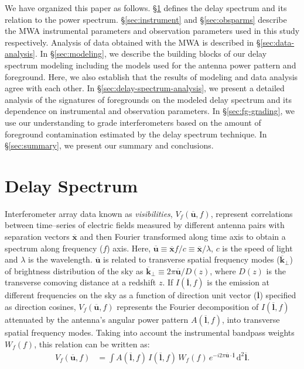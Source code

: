 \documentclass[preprint2,iop,numberedappendix]{emulateapj}
\newcommand{\dif}{\mathrm{d}}
\begin{document}
We have organized this paper as follows. \S\ref{sec:delay-spectrum} defines the delay spectrum and its relation to the power spectrum. \S\ref{sec:instrument} and \S\ref{sec:obsparms} describe the MWA instrumental parameters and observation parameters used in this study respectively. Analysis of data obtained with the MWA is described in \S\ref{sec:data-analysis}. In \S\ref{sec:modeling}, we describe the building blocks of our delay spectrum modeling including the models used for the antenna power pattern and foreground. Here, we also establish that the results of modeling and data analysis agree with each other. In \S\ref{sec:delay-spectrum-analysis}, we present a detailed analysis of the signatures of foregrounds on the modeled delay spectrum and its dependence on instrumental and observation parameters. In \S\ref{sec:fg-grading}, we use our understanding to grade interferometers based on the amount of foreground contamination estimated by the delay spectrum technique. In \S\ref{sec:summary}, we present our summary and conclusions.

\section{Delay Spectrum}\label{sec:delay-spectrum}

Interferometer array data known as {\it visibilities}, $V_f(\overline{\mathbf{u}},f)$, represent correlations between time--series of electric fields measured by different antenna pairs with separation vectors $\overline{\mathbf{x}}$ and then Fourier transformed along time axis to obtain a spectrum along frequency ($f$) axis. Here, $\overline{\mathbf{u}}\equiv \overline{\mathbf{x}}f/c \equiv \overline{\mathbf{x}}/\lambda$, $c$ is the speed of light and $\lambda$ is the wavelength. $\overline{\mathbf{u}}$ is related to transverse spatial frequency modes ($\overline{\mathbf{k}}_\perp$) of brightness distribution of the sky as $\overline{\mathbf{k}}_\perp \equiv 2\pi\overline{\mathbf{u}}/D(z)$, where $D(z)$ is the transverse comoving distance at a redshift $z$. If $I(\overline{\mathbf{l}},f)$ is the emission at different frequencies on the sky as a function of direction unit vector ($\overline{\mathbf{l}}$) specified as direction cosines, $V_f(\overline{\mathbf{u}},f)$ represents the Fourier decomposition of $I(\overline{\mathbf{l}},f)$ attenuated by the antenna's angular power pattern $A(\overline{\mathbf{l}},f)$, into transverse spatial frequency modes. Taking into account the instrumental bandpass weights $W_f(f)$, this relation can be written as:
\begin{align}\label{eqn:obsvis}
  V_f(\overline{\mathbf{u}},f) &= \int A(\overline{\mathbf{l}},f)\,I(\overline{\mathbf{l}},f)\,W_f(f)\,e^{-i2\pi \overline{\mathbf{u}}\cdot\overline{\mathbf{l}}}\,\dif^2 \overline{\mathbf{l}}.
\end{align}
\end{document}
